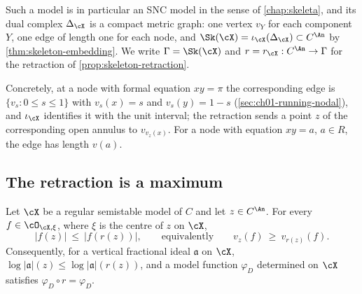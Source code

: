 Such a model is in particular an SNC model in the sense of
\cref{chap:skeleta}, and its dual complex $\Delta_{\cX}$ is a compact metric
graph: one vertex $v_Y$ for each component $Y$, one edge of length one for
each node, and $\Sk(\cX)=\iota_{\cX}(\Delta_\cX)\subset C^{\An}$ by
\cref{thm:skeleton-embedding}.  We write $\Gamma=\Sk(\cX)$ and
$r=r_{\cX}:C^{\An}\to\Gamma$ for the retraction of
\cref{prop:skeleton-retraction}.

Concretely, at a node with formal equation $xy=\pi$ the corresponding edge is
$\{v_s:0\leq s\leq1\}$ with $v_s(x)=s$ and $v_s(y)=1-s$
(\cref{sec:ch01-running-nodal}), and $\iota_{\cX}$ identifies it with the
unit interval; the retraction sends a point $z$ of the corresponding open
annulus to $v_{v_z(x)}$.  For a node with equation $xy=a$, $a\in R$, the
edge has length $v(a)$.

\subsection{The retraction is a maximum}

\begin{proposition}
\label{prop:ch08-retraction-max}
Let $\cX$ be a regular semistable model of $C$ and let
$z\in C^{\An}$.  For every $f\in\cO_{\cX,\xi}$, where $\xi$ is the centre of
$z$ on $\cX$,
\[
                  |f(z)|\ \leq\ |f(r(z))| ,
                  \qquad\text{equivalently}\qquad
                  v_z(f)\ \geq\ v_{r(z)}(f) .
\]
Consequently, for a vertical fractional ideal $\mathfrak a$ on $\cX$,
$\log|\mathfrak a|(z)\leq\log|\mathfrak a|(r(z))$, and a model function
$\varphi_D$ determined on $\cX$ satisfies $\varphi_D\circ r=\varphi_D$.
\end{proposition}

